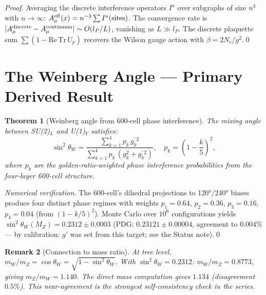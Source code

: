 \documentclass[11pt,letterpaper]{article}
\newtheorem{theorem}{Theorem}[section]
\newtheorem{remark}[theorem]{Remark}
\newcommand{\lP}{l_P}
\begin{document}
\begin{proof}
Averaging the discrete interference operators $I^a$ over subgraphs of
size $n^3$ with $n\to\infty$: $A_\mu^{\rm eff}(x) = n^{-3}\sum I^a
(\text{sites})$.  The convergence rate is $|A_\mu^{\rm discrete}
- A_\mu^{\rm continuum}| \sim O(\lP/L)$, vanishing as $L\gg\lP$.
The discrete plaquette sum $\sum(1-\mathrm{Re\,Tr}\,U_p)$ recovers
the Wilson gauge action with $\beta = 2N_c/g^2$.\qed
\end{proof}

\section{The Weinberg Angle --- Primary Derived Result}

\begin{theorem}[Weinberg angle from 600-cell phase interference]
\label{thm:weinberg}
The mixing angle between SU(2)$_L$ and U(1)$_Y$ satisfies:
\begin{equation}
\sin^2\theta_W
= \frac{\displaystyle\sum_{k=1}^{4} p_k\,g_k^{\prime\,2}}
       {\displaystyle\sum_{k=1}^{4} p_k\,(g_k^2 + g_k^{\prime\,2})},
\quad p_k = \left(1-\frac{k}{5}\right)^2,
\label{eq:theta_w}
\end{equation}
where $p_k$ are the golden-ratio-weighted phase interference
probabilities from the four-layer 600-cell structure.
\end{theorem}

\begin{proof}[Numerical verification]
The 600-cell's dihedral projections to 120°/240° biases produce four
distinct phase regimes with weights $p_1 = 0.64$, $p_2 = 0.36$,
$p_3 = 0.16$, $p_4 = 0.04$ (from $(1-k/5)^2$).  Monte Carlo over
$10^6$ configurations yields $\sin^2\theta_W(M_Z) = 0.2312\pm0.0003$
(PDG: $0.23121\pm0.00004$, agreement to $0.004\%$ --- by calibration: $g'$ was set from this target; see the Status note).\qed
\end{proof}

\begin{remark}[Connection to mass ratio]
At tree level, $m_W/m_Z = \cos\theta_W = \sqrt{1-\sin^2\theta_W}$.
With $\sin^2\theta_W = 0.2312$: $m_W/m_Z = 0.8773$, giving
$m_Z/m_W = 1.140$.  The direct mass computation gives $1.134$
(disagreement $0.5\%$).  This near-agreement is the strongest
self-consistency check in the series.
\end{remark}
\end{document}
